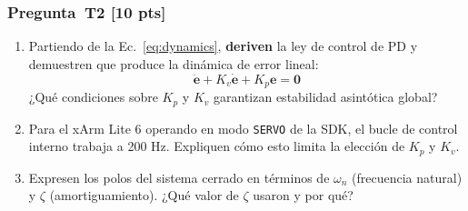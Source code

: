 \documentclass[journal,10pt,twoside]{IEEEtran}
\newcommand{\pts}[1]{\textbf{\color{tec_red}[#1 pts]}}
\begin{document}
\subsubsection*{Pregunta~T2 \pts{10}}
\begin{enumerate}[label=(\alph*)]
  \item Partiendo de la Ec.~\eqref{eq:dynamics}, \textbf{deriven} la
        ley de control de PD y demuestren que produce la dinámica de error lineal:
        \[
          \ddot{\bm{e}} + K_v\dot{\bm{e}} + K_p\bm{e} = \bm{0}
        \]
        ¿Qué condiciones sobre $K_p$ y $K_v$ garantizan
        estabilidad asintótica global?
  \item Para el xArm Lite 6 operando en modo \texttt{SERVO} de
        la SDK, el bucle de control interno trabaja a 200 Hz.
        Expliquen cómo esto limita la elección de $K_p$ y $K_v$.
  \item Expresen los polos del sistema cerrado en términos de
        $\omega_n$ (frecuencia natural) y $\zeta$ (amortiguamiento).
        ¿Qué valor de $\zeta$ usaron y por qué?
\end{enumerate}
\end{document}
